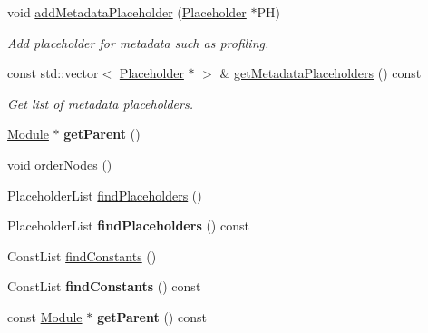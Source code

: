 \begin{DoxyCompactItemize}
void \hyperlink{classglow_1_1_function_acabd268f7c23b3a67401f2df9a5a2540}{add\+Metadata\+Placeholder} (\hyperlink{classglow_1_1_placeholder}{Placeholder} $\ast$PH)
\begin{DoxyCompactList}\small\item\em Add placeholder for metadata such as profiling. \end{DoxyCompactList}\item 
\mbox{\label{classglow_1_1_function_a65e182d5e7ce0b7722236423caeeda6f}} 
const std\+::vector$<$ \hyperlink{classglow_1_1_placeholder}{Placeholder} $\ast$ $>$ \& \hyperlink{classglow_1_1_function_a65e182d5e7ce0b7722236423caeeda6f}{get\+Metadata\+Placeholders} () const
\begin{DoxyCompactList}\small\item\em Get list of metadata placeholders. \end{DoxyCompactList}\item 
\mbox{\label{classglow_1_1_function_ade4385a62022dd1a9dd993f4b3b21a5c}} 
\hyperlink{classglow_1_1_module}{Module} $\ast$ {\bfseries get\+Parent} ()
\item 
void \hyperlink{classglow_1_1_function_ab1dabb8d94895004268410f672079f1a}{order\+Nodes} ()
\item 
Placeholder\+List \hyperlink{classglow_1_1_function_abc73d2632bdeaaa7a2ec029196608ab7}{find\+Placeholders} ()
\item 
\mbox{\label{classglow_1_1_function_a650818e9aa23fa39d25853456c8df56e}} 
Placeholder\+List {\bfseries find\+Placeholders} () const
\item 
Const\+List \hyperlink{classglow_1_1_function_a0668c5170eedf2b84a292367cfb4fbac}{find\+Constants} ()
\item 
\mbox{\label{classglow_1_1_function_a0c7a59dca6b535e94ffaa5d0e72d2d1e}} 
Const\+List {\bfseries find\+Constants} () const
\item 
\mbox{\label{classglow_1_1_function_a5f187ac21a2f08073a24b75c13817b4e}} 
const \hyperlink{classglow_1_1_module}{Module} $\ast$ {\bfseries get\+Parent} () const
\item 
\mbox{\label{classglow_1_1_function_aa0abc2117e80f3253aa91122a7c786e9}} 

\end{DoxyCompactItemize}
